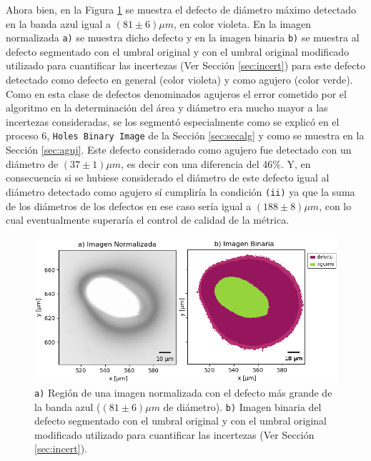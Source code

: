  Ahora bien, en la Figura \ref{fig:deffd} se muestra el defecto de diámetro máximo detectado en la banda azul igual a $(81 \pm 6) \mu m$, en color violeta. En la imagen normalizada \texttt{a)} se muestra dicho defecto y en la imagen binaria \texttt{b)} se muestra al defecto segmentado con el umbral original y con el umbral original modificado utilizado para cuantificar las incertezas (Ver Sección \ref{sec:incert}) para este defecto detectado como defecto en general (color violeta) y como agujero (color verde). Como en esta clase de defectos denominados agujeros el error cometido por el algoritmo en la determinación del área y diámetro era mucho mayor a las incertezas consideradas, se los segmentó especialmente como se explicó en el proceso 6, \texttt{Holes Binary Image} de la Sección \ref{sec:secalg} y como se muestra en la Sección \ref{sec:aguj}. Este defecto considerado como agujero fue detectado con un diámetro de $(37 \pm 1)\mu m$, es decir con una diferencia del 46\%. Y, en consecuencia si se hubiese considerado el diámetro de este defecto igual al diámetro detectado como agujero sí cumpliría la condición \texttt{(ii)} ya que la suma de los diámetros de los defectos en ese caso sería igual a $(188 \pm 8) \mu m$, con lo cual eventualmente superaría el control de calidad de la métrica. 
 \begin{figure}
\centering
\includegraphics[scale=1.0]{Figs/cuantificaciondefectos/agujdefectocompar.png}
	\caption{\texttt{a)} Región de una imagen normalizada con el defecto más grande de la banda azul ($(81 \pm 6) \mu m$ de diámetro). \texttt{b)} Imagen binaria del defecto segmentado con el umbral original y con el umbral original modificado utilizado para cuantificar las incertezas (Ver Sección \ref{sec:incert}). }
\label{fig:deffd}
\end{figure}
 

